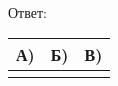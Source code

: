 \\
Ответ: \sepline \\ 
\begin{tabular}{|c|c|c|}
\hline
А) & Б) & В) \\
\hline
\makecell{} & \makecell{} & \makecell{} \\ 
\hline
\end{tabular}
